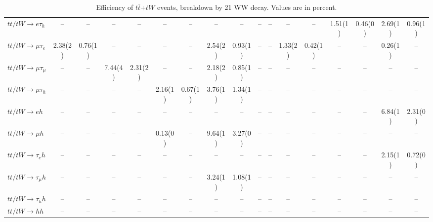 \begin{sidewaystable}[p]
\begin{tabular}{|l|cc|cc|cc|cc|cc|cc|cc|cc|}
    $tt/tW \to e\tau_{h}$              &    --    &    --    &    --    &    --    &    --    &    --    &    --    &    --    &    --    &    --    &    --    &    --    &  1.51(1) &  0.46(0) &  2.69(1) &  0.96(1) \\ 
    $tt/tW \to \mu\tau_{e}$            &  2.38(2) &  0.76(1) &    --    &    --    &    --    &    --    &  2.54(2) &  0.93(1) &    --    &    --    &  1.33(2) &  0.42(1) &    --    &    --    &  0.26(1) &    --    \\ 
    $tt/tW \to \mu\tau_{\mu}$          &    --    &    --    &  7.44(4) &  2.31(2) &    --    &    --    &  2.18(2) &  0.85(1) &    --    &    --    &    --    &    --    &    --    &    --    &    --    &    --    \\ 
    $tt/tW \to \mu\tau_{h}$            &    --    &    --    &    --    &    --    &  2.16(1) &  0.67(1) &  3.76(1) &  1.34(1) &    --    &    --    &    --    &    --    &    --    &    --    &    --    &    --    \\ 
    $tt/tW \to eh$                     &    --    &    --    &    --    &    --    &    --    &    --    &    --    &    --    &    --    &    --    &    --    &    --    &    --    &    --    &  6.84(1) &  2.31(0) \\ 
    $tt/tW \to \mu h$                  &    --    &    --    &    --    &    --    &  0.13(0) &    --    &  9.64(1) &  3.27(0) &    --    &    --    &    --    &    --    &    --    &    --    &    --    &    --    \\ 
    $tt/tW \to \tau_{e}h$              &    --    &    --    &    --    &    --    &    --    &    --    &    --    &    --    &    --    &    --    &    --    &    --    &    --    &    --    &  2.15(1) &  0.72(0) \\ 
    $tt/tW \to \tau_{\mu}h$            &    --    &    --    &    --    &    --    &    --    &    --    &  3.24(1) &  1.08(1) &    --    &    --    &    --    &    --    &    --    &    --    &    --    &    --    \\ 
    $tt/tW \to \tau_{h}h$              &    --    &    --    &    --    &    --    &    --    &    --    &    --    &    --    &    --    &    --    &    --    &    --    &    --    &    --    &    --    &    --    \\ 
    $tt/tW \to hh$                     &    --    &    --    &    --    &    --    &    --    &    --    &    --    &    --    &    --    &    --    &    --    &    --    &    --    &    --    &    --    &    --    \\ 

    \hline
    \end{tabular}
    \caption{Efficiency of $t\bar{t}$+$tW$ events, breakdown by 21 WW decay.  Values are in percent.}
    \label{sigcomp}
    
\end{sidewaystable}
